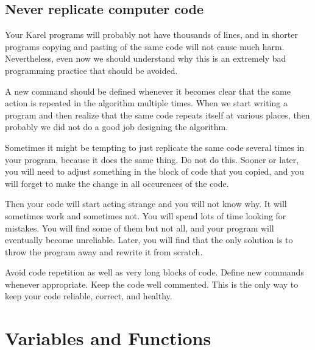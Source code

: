 \subsection{Never replicate computer code}

Your Karel programs will probably not have thousands of lines, 
and in shorter programs copying and pasting of the same code 
will not cause much harm. Nevertheless, even now we should 
understand why this is an extremely bad programming practice
that should be avoided. 

A new command should be defined whenever it becomes clear that the same 
action is repeated in the algorithm multiple times. When we start writing a program and then realize that the same
code repeats itself at various places, then probably we did not do a good job 
designing the algorithm.

Sometimes it might be tempting to just replicate the same code several 
times in your program, because it does the same thing. Do not do this.
Sooner or later, you will need to adjust something in the block of 
code that you copied, and you will forget to make the change in all
occurences of the code. 

Then your code will start acting strange and you will not know why.
It will sometimes work and sometimes not. You will spend lots of time 
looking for mistakes. You will find some of them but not all, and your 
program will eventually become unreliable. Later, you will find that 
the only solution is to throw the program away and rewrite it from scratch.\\

\begin{gbox}
\begin{center}
Avoid code repetition as well as very long blocks of code. Define new commands whenever 
appropriate. Keep the code well commented. This is the only way to keep your code 
reliable, correct, and healthy.  
\end{center}
\end{gbox}
\vspace{4mm}

\noindent



\section{Variables and Functions} \label{sec:var}

